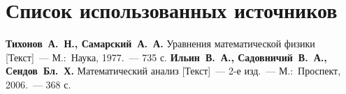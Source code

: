 \chapter*{Список использованных источников}
\begin{thebibliography}{99}
 \textbf{Тихонов~А.~Н., Самарский~А.~А.} Уравнения математической физики [Текст]~--- М.:~Наука, 1977.~--- 735 с.
 \textbf{Ильин~В.~А., Садовничий~В.~А., Сендов~Бл.~Х.} Математический анализ [Текст]~--- 2-е изд.~--- М.:~Проспект, 2006.~--- 368 с.
\end{thebibliography}
% 
% 
